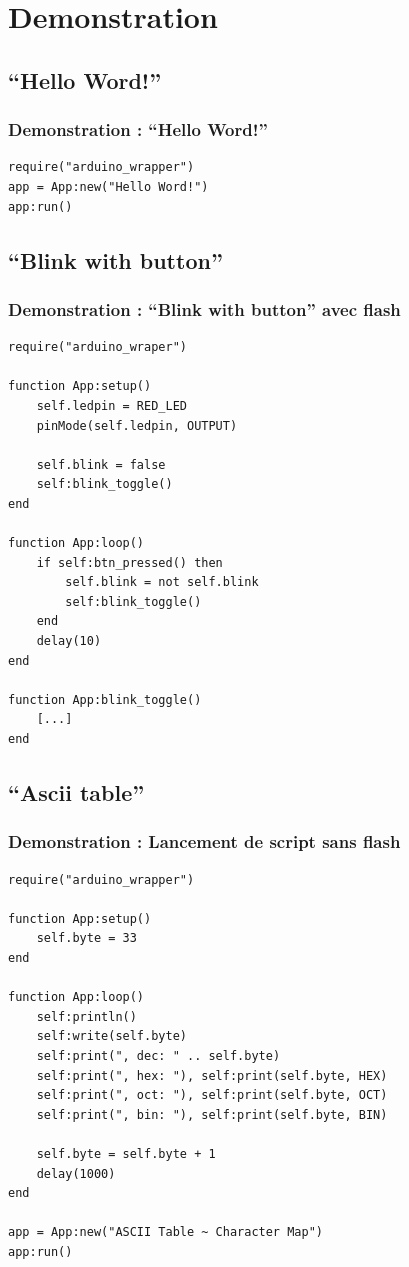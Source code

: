 \documentclass{beamer}
\begin{document}
\section{Demonstration}
\subsection{``Hello Word!''}
\begin{frame}[containsverbatim]
\frametitle{Demonstration : ``Hello Word!''}
\begin{lstlisting}
require("arduino_wrapper")
app = App:new("Hello Word!")
app:run()
\end{lstlisting}
\end{frame}

\subsection{``Blink with button''}
\begin{frame}[containsverbatim]
\frametitle{Demonstration : ``Blink with button'' avec flash}
\tiny{\begin{lstlisting}
require("arduino_wraper")

function App:setup()
    self.ledpin = RED_LED
    pinMode(self.ledpin, OUTPUT)

    self.blink = false
    self:blink_toggle()
end

function App:loop()
    if self:btn_pressed() then
        self.blink = not self.blink
        self:blink_toggle()
    end
    delay(10)
end

function App:blink_toggle()
    [...]
end
\end{lstlisting}}
\end{frame}

\subsection{``Ascii table''}
\begin{frame}[containsverbatim]
\frametitle{Demonstration : Lancement de script sans flash}
\tiny{\begin{lstlisting}
require("arduino_wrapper")

function App:setup()
    self.byte = 33
end

function App:loop()
    self:println()
    self:write(self.byte)
    self:print(", dec: " .. self.byte)
    self:print(", hex: "), self:print(self.byte, HEX)
    self:print(", oct: "), self:print(self.byte, OCT)
    self:print(", bin: "), self:print(self.byte, BIN)

    self.byte = self.byte + 1
    delay(1000)
end

app = App:new("ASCII Table ~ Character Map")
app:run()

\end{lstlisting}}
\end{frame}
\end{document}
